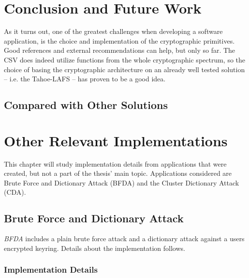 \documentclass[pdftex,english,10pt,b5paper,twoside]{book}
\begin{document}
\chapter{Conclusion and Future Work}
\label{ch:conclusion}

As it turns out, one of the greatest challenges when developing a software
application, is the choice and implementation of the cryptographic primitives.
Good references and external recommendations can help, but only so far.
The \ac{CSV} does indeed utilize functions from the whole cryptographic
spectrum, so the choice of basing the cryptographic architecture on an already
well tested solution -- i.e. the Tahoe-\ac{LAFS} -- has proven to be a good
idea.

\section{Compared with Other Solutions}



\appendix
\appendixpage
\addappheadtotoc
\chapter{Other Relevant Implementations}
\label{ap:other}

This chapter will study implementation details from applications that were
created, but not a part of the thesis' main topic. Applications considered are
Brute Force and Dictionary Attack (BFDA) and the Cluster Dictionary Attack (CDA).

\section{Brute Force and Dictionary Attack}

\emph{\ac{BFDA}} includes a plain brute force attack and a dictionary attack against
a users encrypted keyring. Details about the implementation follows.

\subsection{Implementation Details}
\end{document}
